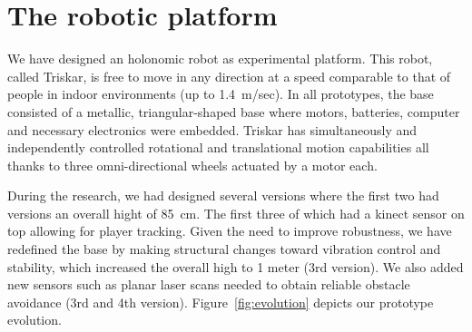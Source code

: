 \section{The robotic platform}\label{sec:roboplat} 
We have designed an holonomic robot as experimental platform. This robot, called Triskar, is free to move in any direction at a speed comparable to that of people in indoor environments (up to 1.4~m/sec). In all prototypes, the base consisted of a metallic, triangular-shaped base where motors, batteries, computer and necessary electronics were embedded. Triskar has simultaneously and independently controlled rotational and translational motion capabilities all thanks to three omni-directional wheels actuated by a motor each. 

During the research, we had designed several versions where the first two had versions an overall hight of 85~cm. The first three of which had a kinect sensor on top allowing for player tracking. Given the need to improve robustness, we have redefined the base by making structural changes toward vibration control and stability, which increased the overall high to 1 meter (3rd version). We also added new sensors such as planar laser scans needed to obtain reliable obstacle avoidance (3rd and 4th version). Figure~\ref{fig:evolution} depicts our prototype evolution.

